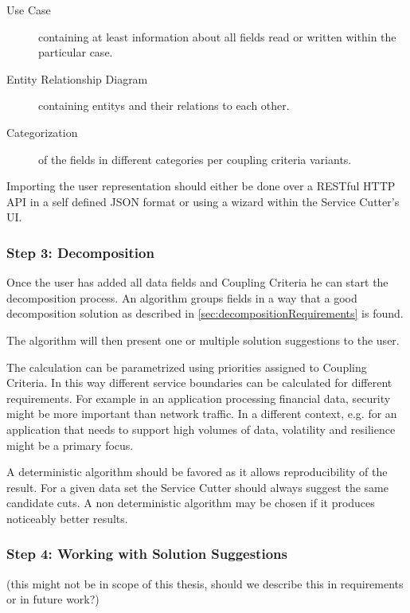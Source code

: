 \begin{description}
	\item[Use Case] containing at least information about all fields read or written within the particular case. 
		\item[Entity Relationship Diagram] containing \glspl{entity} and their relations to each other. 
	\item[Categorization] of the fields in different categories per coupling criteria variants. 
\end{description}

Importing the user representation should either be done over a RESTful HTTP API in a self defined JSON format or using a wizard within the Service Cutter's \gls{UI}.

\subsubsection{Step 3: Decomposition}

Once the user has added all data fields and Coupling Criteria he can start the decomposition process. An algorithm groups fields in a way that a good decomposition solution as described in \ref{sec:decompositionRequirements} is found. 

The algorithm will then present one or multiple solution suggestions to the user.

The calculation can be parametrized using priorities assigned to Coupling Criteria. In this way different service boundaries can be calculated for different requirements. For example in an application processing financial data, security might be more important than network traffic. In a different context, e.g. for an application that needs to support high volumes of data, volatility and resilience might be a primary focus.

A deterministic algorithm should be favored as it allows reproducibility of the result. For a given data set the Service Cutter should always suggest the same candidate cuts. A non deterministic algorithm may be chosen if it produces noticeably better results.

\subsubsection{Step 4: Working with Solution Suggestions}

(this might not be in scope of this thesis, should we describe this in requirements or in future work?)

